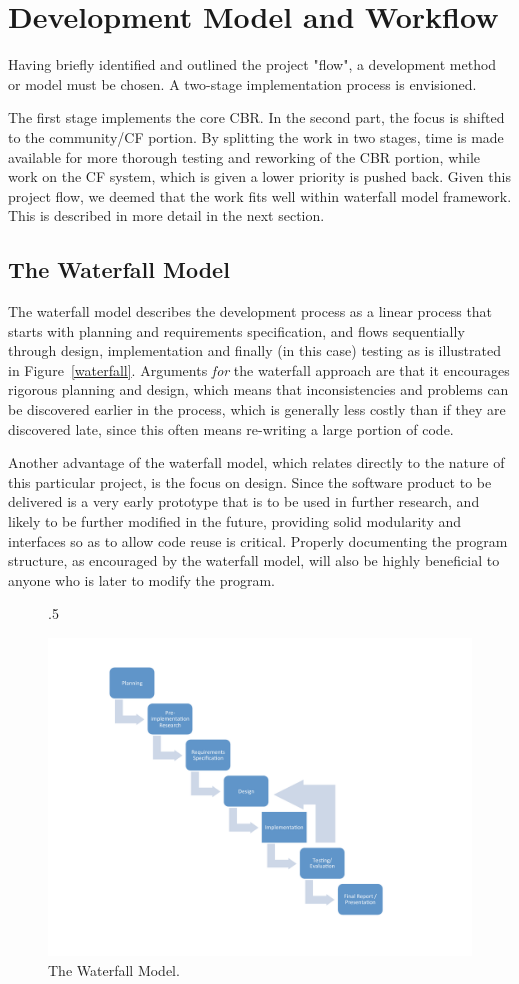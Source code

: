 \section{Development Model and Workflow}
Having briefly identified and outlined the project "flow", a development method or model must be chosen. A two-stage implementation process is envisioned.

The first stage implements the core CBR.  In the second part, the focus is shifted to the community/CF portion. By splitting the work in two stages, time is made available for more thorough testing and reworking of the CBR portion, while work on the CF system, which is given a lower priority is pushed back. Given this project flow, we deemed that the work fits well within waterfall model framework. This is described in more detail in the next section. 


\subsection{The Waterfall Model}
The waterfall model describes the development process as a linear process that starts with planning and requirements specification, and flows sequentially through design, implementation and finally (in this case) testing as is illustrated in Figure~\ref{waterfall}. Arguments \emph{for} the waterfall approach are that it encourages rigorous planning and design, which means that inconsistencies and problems can be discovered earlier in the process, which is generally less costly than if they are discovered late, since this often means re-writing a large portion of code. 

Another advantage of the waterfall model, which relates directly to the nature of this particular project, is the focus on design. Since the software product to be delivered is a very early prototype that is to be used in further research, and likely to be further modified in the future, providing solid modularity and interfaces so as to allow code reuse is critical. Properly documenting the program structure, as encouraged by the waterfall model, will also be highly beneficial to anyone who is later to modify the program.

\begin{figure}[r]{.5\textwidth}
  \begin{center}
    \includegraphics[width = .38\textwidth]{PrelimStudy/workflow}
    \caption{The Waterfall Model.}
    \label{workflow}
  \end{center}
\end{figure}

